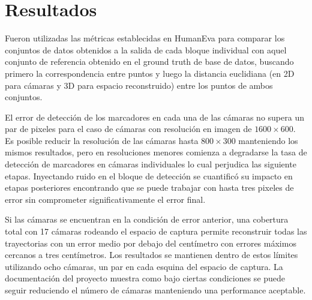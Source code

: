 \section{Resultados}

Fueron utilizadas las métricas establecidas en HumanEva \cite{humaneva} para comparar los conjuntos de datos obtenidos a la salida de cada bloque individual con aquel conjunto de referencia obtenido en el ground truth de base de datos, buscando primero la correspondencia entre puntos y luego la distancia euclidiana (en 2D para cámaras y 3D para espacio reconstruido) entre los puntos de ambos conjuntos.



El error de detección de los marcadores en cada una de las cámaras no supera un par de pixeles para el caso de cámaras con resolución en imagen de $1600\times600$. Es posible reducir la resolución de las cámaras hasta $800\times300$ manteniendo los mismos resultados, pero en resoluciones menores comienza a degradarse la tasa de detección de marcadores en cámaras individuales lo cual perjudica las siguiente etapas. Inyectando ruido en el bloque de detección se cuantificó su impacto en etapas posteriores encontrando que se puede trabajar con hasta tres pixeles de error sin comprometer significativamente el error final.


Si las cámaras se encuentran en la condición de error anterior, una cobertura total con 17 cámaras rodeando el espacio de captura permite reconstruir todas las trayectorias con un error medio por debajo del centímetro con errores máximos cercanos a tres centímetros. Los resultados se mantienen dentro de estos límites utilizando ocho cámaras, un par en cada esquina del espacio de captura.
La documentación del proyecto \cite{proyecto_biomecanica} muestra como bajo ciertas condiciones se puede seguir reduciendo el número de cámaras manteniendo una performance aceptable.

